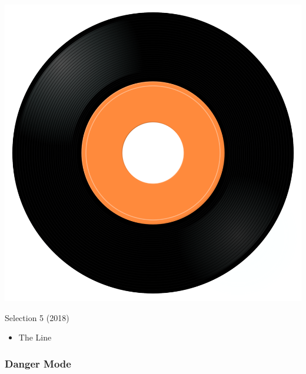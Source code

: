 \begin{minipage}[t]{0.25\textwidth}\vspace{0pt}
\captionsetup{type=figure}
\includegraphics[width=\textwidth]{Images/cover.png}
\caption*{Selection 5 (2018)}
\end{minipage}
\begin{minipage}[t]{0.25\textwidth}\vspace{0pt}
\begin{itemize}[nosep,leftmargin=1em,labelwidth=*,align=left]
	\setlength{\itemsep}{0pt}
	\item The Line
\end{itemize}
\end{minipage}

\subsubsection{Danger Mode}

